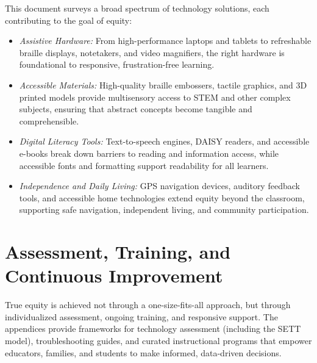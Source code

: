 This document surveys a broad spectrum of \gls{technology} solutions, each contributing to the goal of equity:

\begin{itemize}
	\item \emph{Assistive Hardware:} From high-performance laptops and tablets to refreshable braille displays, notetakers, and video magnifiers, the right hardware is foundational to responsive, frustration-free learning.
	\item \emph{Accessible Materials:} High-quality braille embossers, tactile graphics, and 3D printed models provide multisensory access to STEM and other complex subjects, ensuring that abstract concepts become tangible and comprehensible.
	\item \emph{Digital Literacy Tools:} Text-to-speech engines, DAISY readers, and accessible e-books break down barriers to reading and information access, while accessible fonts and formatting support readability for all learners.
	\item \emph{Independence and Daily Living:} GPS navigation devices, auditory feedback tools, and accessible home technologies extend equity beyond the classroom, supporting safe navigation, independent living, and community participation.
\end{itemize}

\section{Assessment, Training, and Continuous Improvement}
\label{sec:intro-assessment-training}

True equity is achieved not through a one-size-fits-all approach, but through individualized assessment, ongoing training, and responsive support. The appendices provide frameworks for technology assessment (including the SETT model), troubleshooting guides, and curated instructional programs that empower educators, families, and students to make informed, data-driven decisions.

